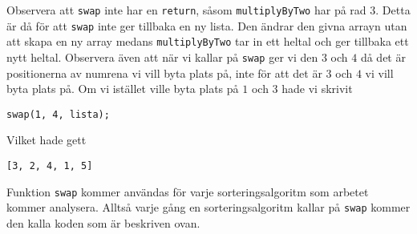 \documentclass[a4, oneside]{report}
\begin{document}
Observera att \lstinline{swap} inte har en \lstinline{return}, såsom \lstinline{multiplyByTwo} har på rad $3$. Detta är då för att \lstinline{swap} inte ger tillbaka en ny lista. Den ändrar den givna arrayn utan att skapa en ny array medans \lstinline{multiplyByTwo} tar in ett heltal och ger tillbaka ett nytt heltal. Observera även att när vi kallar på \lstinline{swap} ger vi den $3$ och $4$ då det är positionerna av numrena vi vill byta plats på, inte för att det är $3$ och $4$ vi vill byta plats på. Om vi istället ville byta plats på $1$ och $3$ hade vi skrivit
\begin{lstlisting}[style=mystyle, numbers=none]
 swap(1, 4, lista);
\end{lstlisting}
Vilket hade gett
\begin{lstlisting}[style=mystyle, numbers=none]
 [3, 2, 4, 1, 5]
\end{lstlisting}
Funktion \lstinline{swap} kommer användas för varje sorteringsalgoritm som arbetet kommer analysera. Alltså varje gång en sorteringsalgoritm kallar på \lstinline{swap} kommer den kalla koden som är beskriven ovan.
\end{document}
